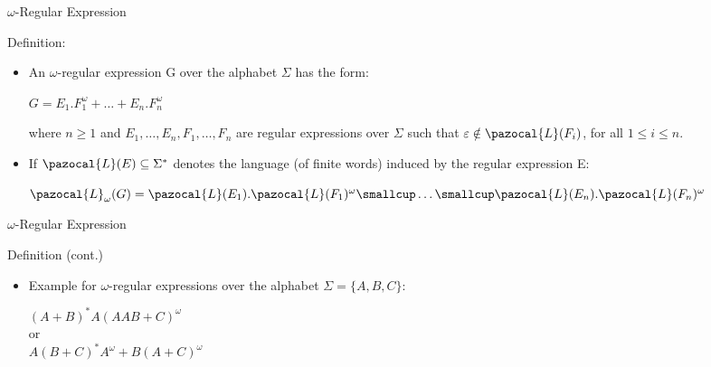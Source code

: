 \documentclass[17pt, t, lualatex]{beamer}
\begin{document}
\begin{frame}{$\omega$-Regular Expression}
\begin{block}{Definition:}
\begin{itemize}
    \item
    An $\omega$-regular expression G over the alphabet $\Sigma$ has the form:
    \begin{center}
        $G = E_1.F_1^{\omega} + \ldots + E_n.F_n^{\omega}$
    \end{center}
    where $n \geq 1$ and $E_1,\ldots,E_n,F_1,\ldots,F_n$ are regular expressions over $\Sigma$ such that $\varepsilon \notin \pazocal{L}(F_i)$, for all $1 \leq i \leq n$.
    \item 
    If $\pazocal{L}(E) \subseteq \Sigma^*$ denotes the language (of finite words) induced by the regular expression E: 
    \begin{center}
        $\pazocal{L}_{\omega}(G) = \pazocal{L}(E_1).\pazocal{L}(F_1)^{\omega} \smallcup \ldots \smallcup \pazocal{L}(E_n).\pazocal{L}(F_n)^{\omega}$
    \end{center}
\end{itemize}
\end{block}
\end{frame}

\begin{frame}{$\omega$-Regular Expression}
\begin{block}{Definition (cont.)}
\begin{itemize}
    \item 
    Example for $\omega$-regular expressions over the alphabet 
    $\Sigma = \{A,B,C\}:$\\[0.4in]
    \begin{center}
        $(A+B)^*A(AAB+C)^{\omega}$ \\[0.15in]
        or\\[0.15in]
        $A(B+C)^*A^{\omega} + B(A+C)^{\omega}$
    \end{center}
\end{itemize}
\end{block}
\end{frame}
\end{document}
